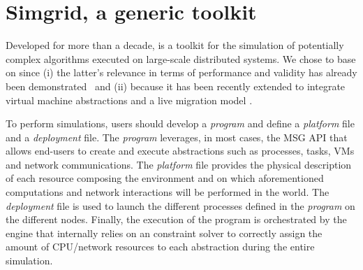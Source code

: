 \section{Simgrid, a generic toolkit}
\label{sec:sg}

Developed for more than a decade,
\sg is a toolkit for the simulation of potentially complex algorithms
executed on large-scale distributed systems.
We chose to base \vmps on \sg since (i) the latter's relevance in
terms of performance and validity has already been
demonstrated~\cite{simgridpub} and (ii) because it has been recently
extended to integrate virtual machine abstractions and a live
migration model \cite{Hirofuchi:2013:ALM:2568486.2568524}.


To perform simulations, users should develop a \emph{program} and
define a \emph{platform} file and a \emph{deployment} file. The
\emph{program} leverages, in most cases, the \sg MSG API that allows
end-users to create and execute \sg abstractions such as processes,
tasks, VMs and network communications. The \emph{platform} file
provides the physical description of each resource composing the
environment and on which aforementioned computations and network
interactions will be performed in the \sg world.
The \emph{deployment} file is used to launch the different \sg
processes defined in the \emph{program} on the different nodes.
Finally, the execution of the program is orchestrated by the \sg
engine that internally relies on an constraint solver to correctly
assign the amount of CPU/network resources to each \sg abstraction
during the entire simulation.

